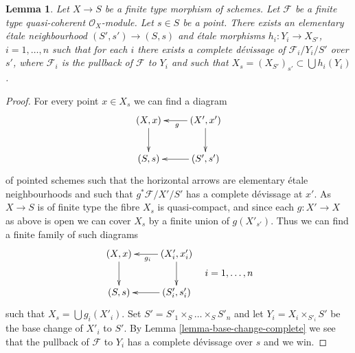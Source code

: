 \documentclass[10pt,a4paper]{amsart}
\theoremstyle{plain}
\newtheorem{lemma}[subsection]{Lemma}
\theoremstyle{definition}
\theoremstyle{remark}
\numberwithin{equation}{subsection}
\begin{document}
\begin{lemma}
\label{lemma-existence-complete}
Let $X \to S$ be a finite type morphism of schemes.
Let $\mathcal{F}$ be a finite type quasi-coherent $\mathcal{O}_X$-module.
Let $s \in S$ be a point.
There exists an elementary \'etale neighbourhood
$(S', s') \to (S, s)$ and \'etale morphisms
$h_i : Y_i \to X_{S'}$, $i = 1, \ldots, n$ such that for each
$i$ there exists a complete d\'evissage of $\mathcal{F}_i/Y_i/S'$ over $s'$,
where $\mathcal{F}_i$ is the pullback of $\mathcal{F}$ to $Y_i$
and such that $X_s = (X_{S'})_{s'} \subset \bigcup h_i(Y_i)$.
\end{lemma}

\begin{proof}
For every point $x \in X_s$ we can find a diagram
$$
\xymatrix{
(X, x) \ar[d] & (X', x') \ar[l]^g \ar[d] \\
(S, s) & (S', s') \ar[l]
}
$$
of pointed schemes such that the horizontal arrows are elementary
\'etale neighbourhoods and such that $g^*\mathcal{F}/X'/S'$ has a
complete d\'evissage at $x'$. As $X \to S$ is of finite type the
fibre $X_s$ is quasi-compact, and since each $g : X' \to X$ as above
is open we can cover $X_s$ by a finite union of $g(X'_{s'})$.
Thus we can find a finite family of such diagrams
$$
\vcenter{
\xymatrix{
(X, x) \ar[d] & (X'_i, x'_i) \ar[l]^{g_i} \ar[d] \\
(S, s) & (S'_i, s'_i) \ar[l]
}
}
\quad i = 1, \ldots, n
$$
such that $X_s = \bigcup g_i(X'_i)$. Set
$S' = S'_1 \times_S \ldots \times_S S'_n$
and let $Y_i = X_i \times_{S'_i} S'$ be the base change of $X'_i$ to $S'$. By
Lemma \ref{lemma-base-change-complete}
we see that the pullback of $\mathcal{F}$ to $Y_i$ has a complete d\'evissage
over $s$ and we win.
\end{proof}
\end{document}
